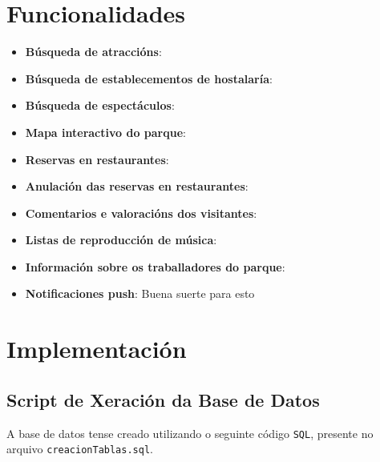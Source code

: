\documentclass[12pt,a4paper]{book}
\theoremstyle{definition}
\theoremstyle{break}
\begin{document}
	\chapter{Funcionalidades}
	\begin{itemize}
		\item \textbf{Búsqueda de atraccións}:
		
		\item \textbf{Búsqueda de establecementos de hostalaría}:
		
		\item \textbf{Búsqueda de espectáculos}:
		
		\item \textbf{Mapa interactivo do parque}:
		
		\item \textbf{Reservas en restaurantes}:
		
		\item \textbf{Anulación das reservas en restaurantes}:
		
		\item \textbf{Comentarios e valoracións dos visitantes}:
		
		\item \textbf{Listas de reproducción de música}:
		
		\item \textbf{Información sobre os traballadores do parque}:
		
		\item \textbf{Notificaciones push}: Buena suerte para esto
		
	\end{itemize}
	
	
	
	\chapter{Implementación}
	\section{Script de Xeración da Base de Datos}
	
	A base de datos tense creado utilizando o seguinte código \texttt{SQL}, presente no arquivo \texttt{creacionTablas.sql}.
	
\end{document}
